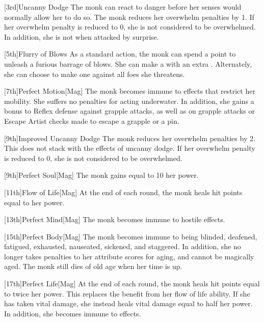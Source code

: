         [3rd]{Uncanny Dodge}
        The monk can react to danger before her senses would normally allow her to do so.
        The monk reduces her overwhelm penalties by 1.
        If her overwhelm penalty is reduced to 0, she is not considered to be overwhelmed.
        In addition, she is not \unaware when attacked by surprise.

        [5th]{Flurry of Blows}\label{Flurry of Blows}
        As a standard action, the monk can spend a \ki point to unleash a furious barrage of blows.
        She can make a  with an extra .
        Alternately, she can choose to make one  against all foes she threatens.

        [7th]{Perfect Motion}[Mag]
        The monk becomes immune to effects that restrict her mobility.
        She suffers no penalties for acting underwater.
        In addition, she gains a  bonus to Reflex defense against grapple attacks, as well as on grapple attacks or Escape Artist checks made to escape a grapple or a pin.

        [9th]{Improved Uncanny Dodge}
        The monk reduces her overwhelm penalties by 2.
        This does not stack with the effects of uncanny dodge.
        If her overwhelm penalty is reduced to 0, she is not considered to be overwhelmed.

        [9th]{Perfect Soul}[Mag]
        The monk gains  equal to 10 \add her \ki power.

        [11th]{Flow of Life}[Mag]
        At the end of each round, the monk heals hit points equal to her \ki power.

        [13th]{Perfect Mind}[Mag]
        The monk becomes immune to hostile  effects.

        [15th]{Perfect Body}[Mag]
        The monk becomes immune to being blinded, deafened, fatigued, exhausted, nauseated, sickened, and staggered.
        In addition, she no longer takes penalties to her attribute scores for aging, and cannot be magically aged.
        The monk still dies of old age when her time is up.

        [17th]{Perfect Life}[Mag]
        At the end of each round, the monk heals hit points equal to twice her \ki power.
        This replaces the benefit from her flow of life ability.
        If she has taken vital damage, she instead heals vital damage equal to half her \ki power.
        In addition, she becomes immune to  effects.

